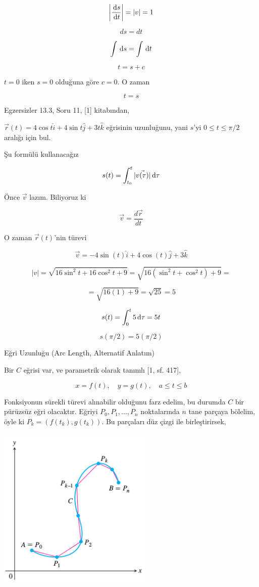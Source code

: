 \documentclass[12pt,fleqn]{article}\usepackage{../../common}
\begin{document}
$$ \bigg|\frac{\,\mathrm{d} s}{\,\mathrm{d} t}\bigg| = |v| = 1 $$

$$ ds = dt $$

$$ \int \,\mathrm{d} s = \int \,\mathrm{d} t $$

$$ t = s + c $$

$t=0$ iken $s=0$ olduğuna göre $c=0$. O zaman 

$$ t = s $$

Egzersizler 13.3, Soru 11, [1] kitabından,

$\vec{r}(t) = 4 \cos t \hat{i} + 4 \sin t \hat{j} + 3t \hat{k}$ 
eğrisinin uzunluğunu, yani $s$'yi  $ 0 \le t \le \pi / 2$ 
aralığı için bul. 

Şu formülü kullanacağız

$$ s(t) = \int_{t_0}^t |\vec{v(\tau)}| \,\mathrm{d}\tau  $$

Önce $\vec{v}$ lazım. Biliyoruz ki

$$ \vec{v} = \frac{d\vec{r}}{dt} $$

O zaman $\vec{r}(t)$'nin türevi

$$ \vec{v} = -4\sin(t)\hat{i} + 4\cos(t)\hat{j} + 3\hat{k} $$

$$ |v| = \sqrt{16\sin^2t + 16\cos^2t  + 9} = 
\sqrt{16(\sin^2t + \cos^2t) + 9} = 
 $$

$$ = \sqrt{16(1) + 9} = \sqrt{25} = 5 $$

$$ s(t) = \int_0^t 5 \,\mathrm{d} \tau = 
5t 
$$

$$ s(\pi / 2) = 5(\pi/2) $$

Eğri Uzunluğu (Arc Length, Alternatif Anlatım)

Bir $C$ eğrisi var, ve parametrik olarak tanımlı [1, sf. 417],

$$
x = f(t), \quad y = g(t), \quad a \le t \le b
$$

Fonksiyonun sürekli türevi alınabilir olduğunu farz edelim, bu durumda $C$ bir
pürüzsüz eğri olacaktır.  Eğriyi $P_0,P_1,...,P_n$ noktalarında $n$ tane parçaya
bölelim, öyle ki $P_k = (f(t_k),g(t_k))$. Bu parçaları düz çizgi ile
birleştirirsek,

\includegraphics[width=20em]{calc_multi_06_01.png}
\end{document}

